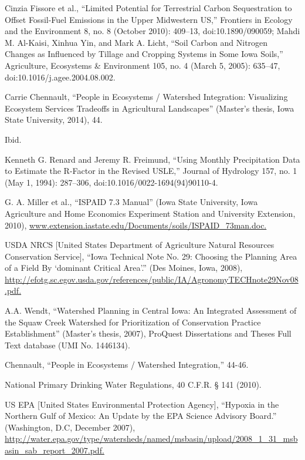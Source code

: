 \documentclass[11pt]{article}
\begin{document}
\begin{itemize}
\begin{thebibliography}{1}
  
Cinzia Fissore et al., “Limited Potential for Terrestrial Carbon Sequestration to Offset Fossil-Fuel Emissions in the Upper Midwestern US,” Frontiers in Ecology and the Environment 8, no. 8 (October 2010): 409–13, doi:10.1890/090059; Mahdi M. Al-Kaisi, Xinhua Yin, and Mark A. Licht, “Soil Carbon and Nitrogen Changes as Influenced by Tillage and Cropping Systems in Some Iowa Soils,” Agriculture, Ecosystems & Environment 105, no. 4 (March 5, 2005): 635–47, doi:10.1016/j.agee.2004.08.002.

    Carrie Chennault, “People in Ecosystems / Watershed Integration: Visualizing Ecosystem Services Tradeoffs in Agricultural Landscapes” (Master’s thesis, Iowa State University, 2014), 44.
  
   Ibid.
  
    Kenneth G. Renard and Jeremy R. Freimund, “Using Monthly Precipitation Data to Estimate the R-Factor in the Revised USLE,” Journal of Hydrology 157, no. 1 (May 1, 1994): 287–306, doi:10.1016/0022-1694(94)90110-4.
  
   G. A. Miller et al., “ISPAID 7.3 Manual” (Iowa State University, Iowa Agriculture and Home Economics Experiment Station and University Extension, 2010), \url{www.extension.iastate.edu/Documents/soils/ISPAID_73man.doc.}
  
   USDA NRCS [United States Department of Agriculture Natural Resources Conservation Service], “Iowa Technical Note No. 29: Choosing the Planning Area of a Field By ‘dominant Critical Area’.” (Des Moines, Iowa, 2008), \url{http://efotg.sc.egov.usda.gov/references/public/IA/AgronomyTECHnote29Nov08.pdf.}
  
   A.A. Wendt, “Watershed Planning in Central Iowa: An Integrated Assessment of the Squaw Creek Watershed for Prioritization of Conservation Practice Establishment” (Master’s thesis, 2007), ProQuest Dissertations and Theses Full Text database (UMI No. 1446134).
  
   Chennault, “People in Ecosystems / Watershed Integration,” 44-46.
  
   National Primary Drinking Water Regulations, 40 C.F.R. § 141 (2010).
  
   US EPA [United States Environmental Protection Agency], “Hypoxia in the Northern Gulf of Mexico: An Update by the EPA Science Advisory Board.” (Washington, D.C, December 2007), \url{http://water.epa.gov/type/watersheds/named/msbasin/upload/2008_1_31_msbasin_sab_report_2007.pdf.}
  

\end{thebibliography}
\end{itemize}
\end{document}
